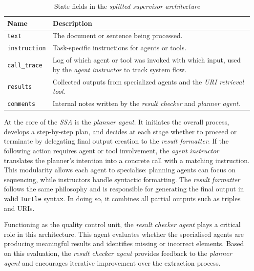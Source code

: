 \documentclass[a4paper,oneside,bibliography=totoc]{scrbook}
\begin{document}
\begin{table}[h]
  \centering
  \caption{State fields in the \textit{splitted supervisor architecture}}
  \label{tab:ssa_state}
  \begin{tabular}{p{3cm}p{10cm}}
    \toprule
    \textbf{Name}        & \textbf{Description}                                                                                                 \\
    \midrule
    \texttt{text}        & The document or sentence being processed.                                                                            \\
    \texttt{instruction} & Task-specific instructions for agents or tools.                                                                      \\
    \texttt{call\_trace} & Log of which agent or tool was invoked with which input, used by the \textit{agent instructor} to track system flow. \\
    \texttt{results}     & Collected outputs from specialized agents and the \textit{\ac{URI} retrieval tool}.                                  \\
    \texttt{comments}    & Internal notes written by the \textit{result checker} and \textit{planner agent}.                                    \\
    \bottomrule
  \end{tabular}
\end{table}

At the core of the \textit{\ac{SSA}} is the \textit{planner agent}. It initiates the overall process, develops a step-by-step plan, and decides at each stage whether to proceed or terminate by delegating final output creation to the \textit{result formatter}. If the following action requires agent or tool involvement, the \textit{agent instructor} translates the planner's intention into a concrete call with a matching instruction. This modularity allows each agent to specialise: planning agents can focus on sequencing, while instructors handle syntactic formatting. The \textit{result formatter} follows the same philosophy and is responsible for generating the final output in valid \texttt{Turtle} syntax. In doing so, it combines all partial outputs such as triples and \acp{URI}.

Functioning as the quality control unit, the \textit{result checker agent} plays a critical role in this architecture. This agent evaluates whether the specialised agents are producing meaningful results and identifies missing or incorrect elements. Based on this evaluation, the \textit{result checker agent} provides feedback to the \textit{planner agent} and encourages iterative improvement over the extraction process.
\end{document}
